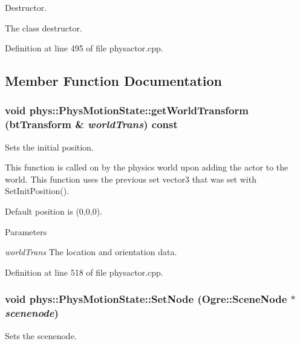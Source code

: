 Destructor. 

The class destructor. 

Definition at line 495 of file physactor.cpp.



\subsection{Member Function Documentation}
\hypertarget{classphys_1_1PhysMotionState_a80e8549fbab99150ba8f34aa3bf087d8}{
\subsubsection[{getWorldTransform}]{\setlength{\rightskip}{0pt plus 5cm}void phys::PhysMotionState::getWorldTransform (btTransform \& {\em worldTrans}) const}}
\label{dc/d0d/classphys_1_1PhysMotionState_a80e8549fbab99150ba8f34aa3bf087d8}


Sets the initial position. 

This function is called on by the physics world upon adding the actor to the world. This function uses the previous set vector3 that was set with SetInitPosition(). \par
 Default position is (0,0,0). 
\begin{DoxyParams}{Parameters}
\item[{\em worldTrans}]The location and orientation data. \end{DoxyParams}


Definition at line 518 of file physactor.cpp.

\hypertarget{classphys_1_1PhysMotionState_a034376e768543b377430611dff323412}{
\subsubsection[{SetNode}]{\setlength{\rightskip}{0pt plus 5cm}void phys::PhysMotionState::SetNode (Ogre::SceneNode $\ast$ {\em scenenode})}}
\label{dc/d0d/classphys_1_1PhysMotionState_a034376e768543b377430611dff323412}


Sets the scenenode. 

